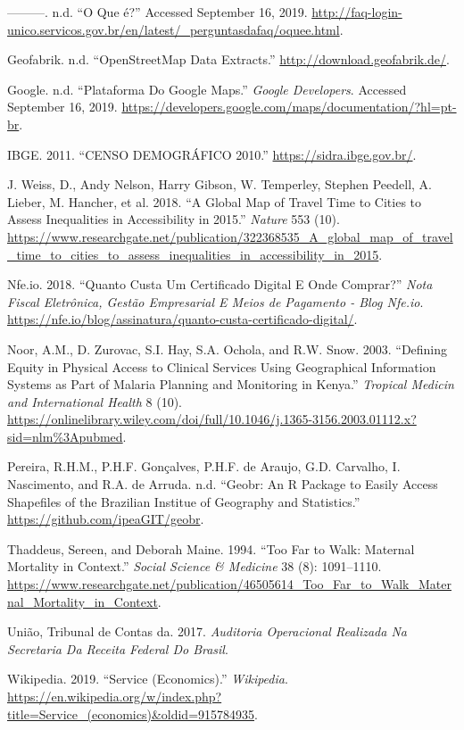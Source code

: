 \documentclass[]{article}
\begin{document}
\leavevmode\hypertarget{ref-ministerio_da_economia_o_nodate}{}%
---------. n.d. ``O Que é?'' Accessed September 16, 2019.
\url{http://faq-login-unico.servicos.gov.br/en/latest/_perguntasdafaq/oquee.html}.

\leavevmode\hypertarget{ref-geofabrik_openstreetmap_nodate}{}%
Geofabrik. n.d. ``OpenStreetMap Data Extracts.''
\url{http://download.geofabrik.de/}.

\leavevmode\hypertarget{ref-google_plataforma_nodate}{}%
Google. n.d. ``Plataforma Do Google Maps.'' \emph{Google Developers}.
Accessed September 16, 2019.
\url{https://developers.google.com/maps/documentation/?hl=pt-br}.

\leavevmode\hypertarget{ref-ibge_censo_2011}{}%
IBGE. 2011. ``CENSO DEMOGRÁFICO 2010.''
\url{https://sidra.ibge.gov.br/}.

\leavevmode\hypertarget{ref-j._weiss_global_2018}{}%
J. Weiss, D., Andy Nelson, Harry Gibson, W. Temperley, Stephen Peedell,
A. Lieber, M. Hancher, et al. 2018. ``A Global Map of Travel Time to
Cities to Assess Inequalities in Accessibility in 2015.'' \emph{Nature}
553 (10).
\url{https://www.researchgate.net/publication/322368535_A_global_map_of_travel_time_to_cities_to_assess_inequalities_in_accessibility_in_2015}.

\leavevmode\hypertarget{ref-nfe.io_quanto_2018}{}%
Nfe.io. 2018. ``Quanto Custa Um Certificado Digital E Onde Comprar?''
\emph{Nota Fiscal Eletrônica, Gestão Empresarial E Meios de Pagamento -
Blog Nfe.io}.
\url{https://nfe.io/blog/assinatura/quanto-custa-certificado-digital/}.

\leavevmode\hypertarget{ref-noor_defining_2003}{}%
Noor, A.M., D. Zurovac, S.I. Hay, S.A. Ochola, and R.W. Snow. 2003.
``Defining Equity in Physical Access to Clinical Services Using
Geographical Information Systems as Part of Malaria Planning and
Monitoring in Kenya.'' \emph{Tropical Medicin and International Health}
8 (10).
\url{https://onlinelibrary.wiley.com/doi/full/10.1046/j.1365-3156.2003.01112.x?sid=nlm\%3Apubmed}.

\leavevmode\hypertarget{ref-pereira_geobr:_nodate}{}%
Pereira, R.H.M., P.H.F. Gonçalves, P.H.F. de Araujo, G.D. Carvalho, I.
Nascimento, and R.A. de Arruda. n.d. ``Geobr: An R Package to Easily
Access Shapefiles of the Brazilian Institue of Geography and
Statistics.'' \url{https://github.com/ipeaGIT/geobr}.

\leavevmode\hypertarget{ref-thaddeus_too_1994}{}%
Thaddeus, Sereen, and Deborah Maine. 1994. ``Too Far to Walk: Maternal
Mortality in Context.'' \emph{Social Science \& Medicine} 38 (8):
1091--1110.
\url{https://www.researchgate.net/publication/46505614_Too_Far_to_Walk_Maternal_Mortality_in_Context}.

\leavevmode\hypertarget{ref-uniao_auditoria_2017}{}%
União, Tribunal de Contas da. 2017. \emph{Auditoria Operacional
Realizada Na Secretaria Da Receita Federal Do Brasil}.

\leavevmode\hypertarget{ref-wikipedia_service_2019}{}%
Wikipedia. 2019. ``Service (Economics).'' \emph{Wikipedia}.
\url{https://en.wikipedia.org/w/index.php?title=Service_(economics)\&oldid=915784935}.
\end{document}
